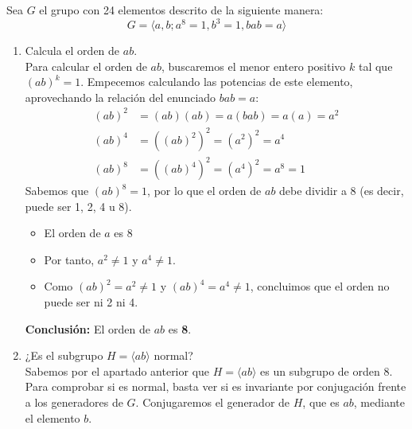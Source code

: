 \documentclass[12pt]{article}
\begin{document}
    \begin{ejercicio}[0.5 puntos]
        Sea $G$ el grupo con 24 elementos descrito de la siguiente manera:
        \[
        G = \langle a, b ; a^8 = 1, b^3 = 1, bab = a \rangle
        \]
        \begin{enumerate}[label=\alph*)]
            \item Calcula el orden de $ab$.\\
            Para calcular el orden de $ab$, buscaremos el menor entero positivo $k$ tal que $(ab)^k = 1$. Empecemos calculando las potencias de este elemento, aprovechando la relación del enunciado $bab = a$:
            \begin{align*}
                (ab)^2 &= (ab)(ab) = a(bab) = a(a) = a^2 \\
                (ab)^4 &= \left((ab)^2\right)^2 = (a^2)^2 = a^4 \\
                (ab)^8 &= \left((ab)^4\right)^2 = (a^4)^2 = a^8 = 1
            \end{align*}
            Sabemos que $(ab)^8 = 1$, por lo que el orden de $ab$ debe dividir a 8 (es decir, puede ser 1, 2, 4 u 8).
            \begin{itemize}
                \item El orden de $a$ es 8
                \item Por tanto, $a^2 \neq 1$ y $a^4 \neq 1$.
                \item Como $(ab)^2 = a^2 \neq 1$ y $(ab)^4 = a^4 \neq 1$, concluimos que el orden no puede ser ni 2 ni 4.
            \end{itemize}
            \textbf{Conclusión:} El orden de $ab$ es \textbf{8}.
            
            \item ¿Es el subgrupo $H = \langle ab \rangle$ normal?\\
            Sabemos por el apartado anterior que $H = \langle ab \rangle$ es un subgrupo de orden 8. 
            Para comprobar si es normal, basta ver si es invariante por conjugación frente a los generadores de $G$. Conjugaremos el generador de $H$, que es $ab$, mediante el elemento $b$.


\end{enumerate}
\end{ejercicio}
\end{document}

